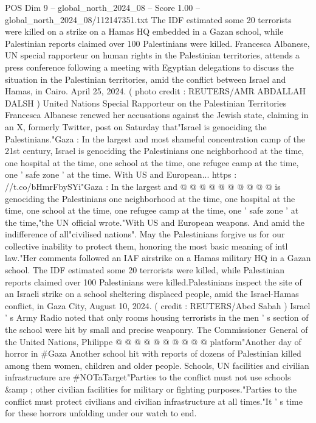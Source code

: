 \begin{textsample}{POS Dim 9 – global\_north\_2024\_08 – Score 1.00 – global\_north\_2024\_08/112147351.txt}  \label{ex:f9_pos_356}
The IDF estimated some 20 terrorists were killed on a strike on a Hamas HQ embedded in a Gazan school, while Palestinian reports claimed over 100 Palestinians were killed.
Francesca Albanese, UN special rapporteur on human rights in the Palestinian territories, attends a press conference following a meeting with Egyptian delegations to discuss the situation in the Palestinian territories, amid the conflict between Israel and Hamas, in Cairo.
April 25, 2024. ( photo credit : REUTERS/AMR ABDALLAH DALSH ) United Nations Special Rapporteur on the Palestinian Territories Francesca Albanese renewed her accusations against the Jewish state, claiming in an X, formerly Twitter, post on Saturday that"Israel is genociding the Palestinians."Gaza : In the largest and most shameful concentration camp of the 21st century, Israel is genociding the Palestinians one neighborhood at the time, one hospital at the time, one school at the time, one refugee camp at the time, one ' safe zone ' at the time.
With US and European... https : //t.co/bHmrFbySYi"Gaza : In the largest and @ @ @ @ @ @ @ @ @ @ is genociding the Palestinians one neighborhood at the time, one hospital at the time, one school at the time, one refugee camp at the time, one ' safe zone ' at the time,"the UN official wrote."With US and European weapons.
And amid the indifference of all"civilised nations".
May the Palestinians forgive us for our collective inability to protect them, honoring the most basic meaning of intl law."Her comments followed an IAF airstrike on a Hamas military HQ in a Gazan school.
The IDF estimated some 20 terrorists were killed, while Palestinian reports claimed over 100 Palestinians were killed.Palestinians inspect the site of an Israeli strike on a school sheltering displaced people, amid the Israel-Hamas conflict, in Gaza City, August 10, 2024. ( credit : REUTERS/Abed Sabah ) Israel ' s Army Radio noted that only rooms housing terrorists in the men ' s section of the school were hit by small and precise weaponry.
The Commissioner General of the United Nations, Philippe @ @ @ @ @ @ @ @ @ @ platform"Another day of horror in \#Gaza Another school hit with reports of dozens of Palestinian killed among them women, children and older people.
Schools, UN facilities and civilian infrastructure are \#NOTaTarget"Parties to the conflict must not use schools \&amp ; other civilian facilities for military or fighting purposes."Parties to the conflict must protect civilians and civilian infrastructure at all times."It ' s time for these horrors unfolding under our watch to end.

\end{textsample}
